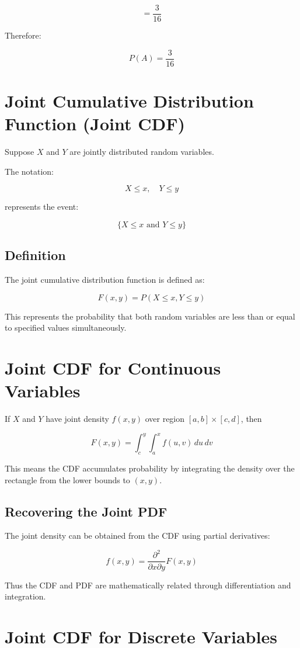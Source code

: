 \documentclass[12pt]{article}
\begin{document}
\[
=\frac{3}{16}
\]

Therefore:

\[
P(A)=\frac{3}{16}
\]

\section{Joint Cumulative Distribution Function (Joint CDF)}

Suppose $X$ and $Y$ are jointly distributed random variables.

The notation:

\[
X \le x, \quad Y \le y
\]

represents the event:

\[
\{X \le x \text{ and } Y \le y\}
\]

\subsection*{Definition}

The joint cumulative distribution function is defined as:

\[
F(x,y)=P(X\le x,Y\le y)
\]

This represents the probability that both random variables are less than or equal to specified values simultaneously.

\section{Joint CDF for Continuous Variables}

If $X$ and $Y$ have joint density $f(x,y)$ over region $[a,b]\times[c,d]$, then

\[
F(x,y)=\int_{c}^{y}\int_{a}^{x} f(u,v)\,du\,dv
\]

This means the CDF accumulates probability by integrating the density over the rectangle from the lower bounds to $(x,y)$.

\subsection*{Recovering the Joint PDF}

The joint density can be obtained from the CDF using partial derivatives:

\[
f(x,y)=\frac{\partial^2}{\partial x \partial y}F(x,y)
\]

Thus the CDF and PDF are mathematically related through differentiation and integration.

\section{Joint CDF for Discrete Variables}
\end{document}
